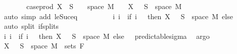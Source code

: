 \begin{isabellebody}
\ \ \ \ \isamarkupfalse%
\ \isamarkupfalse%
\ {\isachardoublequoteopen}case{\isacharunderscore}{\kern0pt}prod\ X\ {\isacharminus}{\kern0pt}{\isacharbackquote}{\kern0pt}\ S\ {\isasyminter}\ {\isacharparenleft}{\kern0pt}{\isacharbraceleft}{\kern0pt}{}{\isacharbraceright}{\kern0pt}\ {\isasymtimes}\ space\ M{\isacharparenright}{\kern0pt}\ {\isacharequal}{\kern0pt}\ {\isacharbraceleft}{\kern0pt}{}{\isacharbraceright}{\kern0pt}\ {\isasymtimes}\ {\isacharparenleft}{\kern0pt}X\ {}\ {\isacharminus}{\kern0pt}{\isacharbackquote}{\kern0pt}\ S\ {\isasyminter}\ space\ M{\isacharparenright}{\kern0pt}{\isachardoublequoteclose}\ \isamarkupfalse%
\ {\isacharparenleft}{\kern0pt}auto\ simp\ add{\isacharcolon}{\kern0pt}\ le{\isacharunderscore}{\kern0pt}Suc{\isacharunderscore}{\kern0pt}eq{\isacharparenright}{\kern0pt}\isanewline
\ \ \ \ \isamarkupfalse%
\ \isamarkupfalse%
\ {\isachardoublequoteopen}{\isachardot}{\kern0pt}{\isachardot}{\kern0pt}{\isachardot}{\kern0pt}\ {\isacharequal}{\kern0pt}\ {\isacharparenleft}{\kern0pt}{\isasymUnion}i{\isachardot}{\kern0pt}\ {\isacharbraceleft}{\kern0pt}i{\isacharbraceright}{\kern0pt}\ {\isasymtimes}\ {\isacharparenleft}{\kern0pt}if\ i\ {\isacharequal}{\kern0pt}\ {}\ then\ X\ {}\ {\isacharminus}{\kern0pt}{\isacharbackquote}{\kern0pt}\ S\ {\isasyminter}\ space\ M\ else\ {\isacharbraceleft}{\kern0pt}{\isacharbraceright}{\kern0pt}{\isacharparenright}{\kern0pt}{\isacharparenright}{\kern0pt}{\isachardoublequoteclose}\ \isamarkupfalse%
\ {\isacharparenleft}{\kern0pt}auto\ split{\isacharcolon}{\kern0pt}\ if{\isacharunderscore}{\kern0pt}splits{\isacharparenright}{\kern0pt}\isanewline
\ \ \ \ \isamarkupfalse%
\ \isamarkupfalse%
\ {\isachardoublequoteopen}{\isacharparenleft}{\kern0pt}{\isasymUnion}i{\isachardot}{\kern0pt}\ {\isacharbraceleft}{\kern0pt}i{\isacharbraceright}{\kern0pt}\ {\isasymtimes}\ {\isacharparenleft}{\kern0pt}if\ i\ {\isacharequal}{\kern0pt}\ {}\ then\ X\ {}\ {\isacharminus}{\kern0pt}{\isacharbackquote}{\kern0pt}\ S\ {\isasyminter}\ space\ M\ else\ {\isacharbraceleft}{\kern0pt}{\isacharbraceright}{\kern0pt}{\isacharparenright}{\kern0pt}{\isacharparenright}{\kern0pt}\ {\isasymin}\ predictable{\isacharunderscore}{\kern0pt}sigma{\isachardoublequoteclose}\ \isamarkupfalse%
\ argo\isanewline
\ \ \ \ \isamarkupfalse%
\ \isamarkupfalse%
\ {\isachardoublequoteopen}X\ {}\ {\isacharminus}{\kern0pt}{\isacharbackquote}{\kern0pt}\ S\ {\isasyminter}\ space\ M\ {\isasymin}\ sets\ {\isacharparenleft}{\kern0pt}F\ {}{\isacharparenright}{\kern0pt}{\isachardoublequoteclose}\ \isamarkupfalse%

\end{isabellebody}
